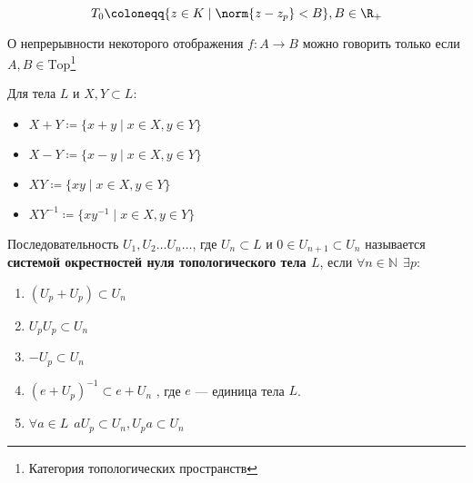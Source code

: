 \begin{example}
    \[T_0 \coloneqq \{z \in K \mid \norm{z - z_p} < B\}, B \in \R_+\] 
\end{example}

О непрерывности некоторого отображения \(f : A \to B\) можно говорить только если \(A, B \in \mathrm{Top}\)\footnote{Категория топологических пространств}




\begin{notation}
    Для тела \(L\) и \(X, Y \subset L\):
     \begin{itemize}
        \item \(X+Y \coloneqq \{x + y \mid x \in X, y \in Y\}\)
        \item \(X-Y \coloneqq \{x - y \mid x \in X, y \in Y\}\)
        \item \(XY \coloneqq \{xy \mid x \in X, y \in Y\}\)
        \item \(XY^{-1} \coloneqq \{xy^{-1} \mid x \in X, y \in Y\}\)
    \end{itemize}
\end{notation}

\begin{definition}
    Последовательность \(U_1, U_2 \ldots U_n \ldots\),
    где \(U_n \subset L\) и \(0 \in U_{n + 1} \subset U_n\) называется
    \textbf{системой окрестностей нуля топологического тела \(L\)},
    если \(\forall n \in \mathbb{N} \ \ \exists p:\)
    \begin{enumerate}
        \item \((U_p + U_p) \subset U_n\)
        \item \(U_p U_p \subset U_n\)
        \item \(- U_p \subset U_n\)
        \item \((e + U_p)^{-1} \subset e + U_n\) 
            , где \(e\) --- единица тела \(L\).
        \item \(\forall a \in L \ \ a U_p \subset U_n, U_p a \subset U_n\)
    \end{enumerate}
\end{definition} 

